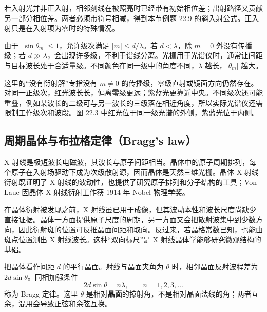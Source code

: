 若入射光并非正入射，相邻刻线在被照亮时已经带有初始相位差；出射路径又贡献另一部分相位差。两者必须带符号相减，得到本节例题 22.9 的斜入射公式。正入射只是在入射项为零时的特殊情况。

\GratingDiagram
\SpectrumDiagram
\GratingCurves

由于 $|\sin\theta_m|\le1$，允许级次满足 $|m|\le d/\lambda$。若 $d<\lambda$，除 $m=0$ 外没有传播级；若 $d\gg\lambda$，会出现许多级，不利于谱线分离。光栅用于光谱仪时，通常让间距与目标波长处于合适量级。不同颜色在同一级中的角度不同，$\lambda$ 越长，$|\theta_m|$ 越大。

这里的“没有衍射解”专指没有 $m\ne0$ 的传播级，零级直射或镜面方向仍然存在。对同一正级次，红光波长长，偏离零级更远；紫蓝光更靠近中央。不同级次还可能重叠，例如某波长的二级可与另一波长的三级落在相近角度，所以实际光谱仪还需限制工作级次和波段。图 22.3 中红光位于同一级光谱的外侧，紫蓝光位于内侧。

\subsection*{周期晶体与布拉格定律（Bragg's law）}

X 射线是极短波长电磁波，其波长与原子间距相当。晶体中的原子周期排列，每个原子在入射场驱动下成为次级散射源，因而晶体是天然三维光栅。晶体 X 射线衍射既证明了 X 射线的波动性，也提供了研究原子排列和分子结构的工具；Von Laue 因晶体 X 射线衍射工作获 1914 年 Nobel 物理学奖。

在晶体衍射被发现之前，X 射线虽已用于成像，但其波动本性和波长尺度尚缺少直接证据。晶体一方面提供原子尺度的周期，另一方面又会把散射波集中到少数方向，因此衍射斑的位置可反推晶面间距和取向。反过来，若晶格常数已知，也能由斑点位置测出 X 射线波长。这种“双向标尺”是 X 射线晶体学能够研究微观结构的基础。

把晶体看作间距 $d$ 的平行晶面。射线与晶面夹角为 $\theta$ 时，相邻晶面反射波程差为 $2d\sin\theta$。同相加强条件
\begin{equation}
 2d\sin\theta=n\lambda,\qquad n=1,2,3,\ldots
\end{equation}
称为 Bragg 定律。这里 $\theta$ 是相对\textbf{晶面}的掠射角，不是相对晶面法线的角；两者互余，混用会导致正弦和余弦互换。


